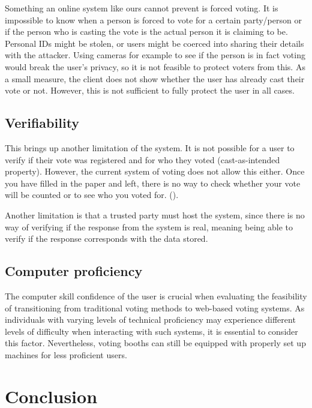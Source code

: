 \documentclass[a4paper,12pt,english]{article}
\begin{document}
Something an online system like ours cannot prevent is forced voting. It is impossible to know when a person is forced to vote for a certain party/person or if the person who is casting the vote is the actual person it is claiming to be. Personal IDs might be stolen, or users might be coerced into sharing their details with the attacker. Using cameras for example to see if the person is in fact voting would break the user’s privacy, so it is not feasible to protect voters from this. As a small measure, the client does not show whether the user has already cast their vote or not. However, this is not sufficient to fully protect the user in all cases.

\subsection{Verifiability}\label{sec:limit-verifiability}

This brings up another limitation of the system. It is not possible for a user to verify if their vote was registered and for who they voted (cast-as-intended property). However, the current system of voting does not allow this either. Once you have filled in the paper and left, there is no way to check whether your vote will be counted or to see who you voted for. (\cite{cryptoeprint:2016/287}).

Another limitation is that a trusted party must host the system, since there is no way of verifying if the response from the system is real, meaning being able to verify if the response corresponds with the data stored.

\subsection{Computer proficiency}\label{sec:limit-proficiency}

The computer skill confidence of the user is crucial when evaluating the feasibility of transitioning from traditional voting methods to web-based voting systems. As individuals with varying levels of technical proficiency may experience different levels of difficulty when interacting with such systems, it is essential to consider this factor. Nevertheless, voting booths can still be equipped with properly set up machines for less proficient users.

\section{Conclusion}\label{sec:conclusion}
\end{document}
